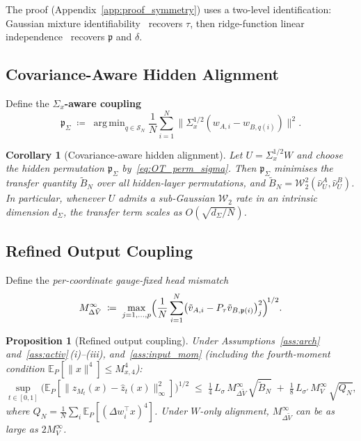 \documentclass[11pt]{article}
\newtheorem{proposition}[theorem]{Proposition}
\newtheorem{corollary}[theorem]{Corollary}
\DeclareMathOperator*{\argmin}{arg\,min}
\newcommand{\E}{\mathbb{E}}
\newcommand{\cW}{\mathcal{W}}
\newcommand{\cS}{\mathcal{S}}
\newcommand{\nperm}{\mathfrak{p}}  %
\begin{document}
The proof (Appendix~\ref{app:proof_symmetry}) uses a two-level
identification: Gaussian mixture
identifiability~\cite{yakowitz1968} recovers $\tau$, then
ridge-function linear independence~\cite{pinkus1999} recovers
$\nperm$ and $\delta$.

\subsection{Covariance-Aware Hidden Alignment}\label{app:cov_aware}

Define the \textbf{$\Sigma_x$-aware coupling}
\begin{equation}\label{eq:OT_perm_sigma}
  \nperm_{\Sigma}
  \;\coloneqq\;
  \argmin_{q \in \cS_N}
  \frac{1}{N}\sum_{i=1}^N
  \bigl\|\Sigma_x^{1/2}(w_{A,i} - w_{B,q(i)})\bigr\|^2.
\end{equation}

\begin{corollary}[Covariance-aware hidden alignment]\label{cor:sigma_ot}
Let $U = \Sigma_x^{1/2}W$ and choose the hidden permutation
$\nperm_{\Sigma}$ by~\eqref{eq:OT_perm_sigma}.
Then $\nperm_{\Sigma}$ minimises the transfer quantity
$\tilde B_N$ over all hidden-layer permutations, and
$\tilde B_N = \cW_2^2(\hat\nu_U^A,\hat\nu_U^B)$.
In particular, whenever $U$ admits a sub-Gaussian $\cW_2$ rate in an
intrinsic dimension $d_{\Sigma}$, the transfer term scales as
$O(\sqrt{d_{\Sigma}/N})$.
\end{corollary}

\subsection{Refined Output Coupling}\label{app:refined_coupling}

Define the \emph{per-coordinate gauge-fixed head mismatch}
\begin{equation}\label{eq:head_mismatch_inf}
  M_{\Delta \tilde V}^\infty
  \;\coloneqq\;
  \max_{j=1,\ldots,p}
  \Bigl(\frac{1}{N}\sum_{i=1}^N
  \bigl(\tilde v_{A,i} - P_\tau \tilde v_{B,\nperm(i)}\bigr)_j^2\Bigr)^{\!1/2}.
\end{equation}

\begin{proposition}[Refined output coupling]\label{prop:transfer_refined}
Under Assumptions~\ref{ass:arch} and~\ref{ass:activ}\,(i)--(iii),
and~\ref{ass:input_mom} (including the fourth-moment condition
$\E_P[\|x\|^4] \le M_{x,4}^4$):
\begin{equation}\label{eq:transfer_refined}
  \sup_{t\in[0,1]}
  \bigl(\E_P[\|z_{M_t}(x) - \hat z_t(x)\|_\infty^2]\bigr)^{1/2}
  \;\le\;
  \tfrac{1}{4}\,L_\sigma\,M_{\Delta \tilde V}^\infty\,\sqrt{\tilde B_N}
  \;+\;
  \tfrac{1}{8}\,L_{\sigma'}\,M_V^\infty\,\sqrt{Q_N},
\end{equation}
where $Q_N = \frac{1}{N}\sum_{i} \E_P[(\Delta w_i^\top x)^4]$.
Under $W$-only alignment, $M_{\Delta \tilde V}^\infty$ can be as large as
$2M_V^\infty$.
\end{proposition}
\end{document}
